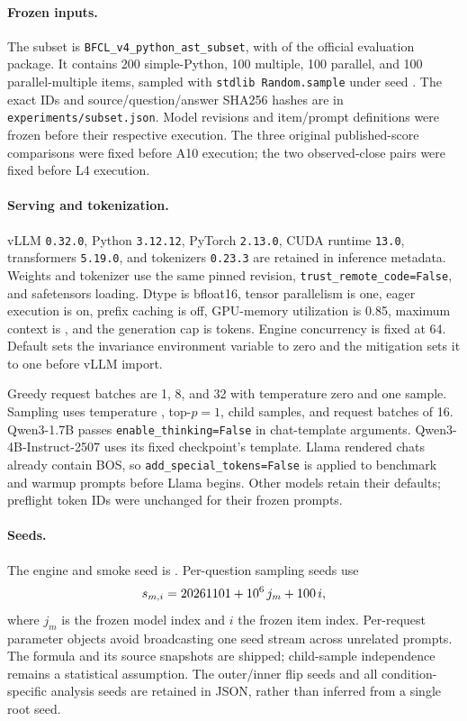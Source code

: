 \documentclass[10pt,twocolumn]{article}
\newcommand{\code}[1]{\texttt{#1}}
\begin{document}
\paragraph{Frozen inputs.}
The subset is \code{BFCL\_v4\_python\_ast\_subset}, with \BFCLVersion{} of the official evaluation package. It contains 200 simple-Python, 100 multiple, 100 parallel, and 100 parallel-multiple items, sampled with \code{stdlib Random.sample} under seed \RootSeed{}. The exact IDs and source/question/answer SHA256 hashes are in \code{experiments/subset.json}. Model revisions and item/prompt definitions were frozen before their respective execution. The three original published-score comparisons were fixed before A10 execution; the two observed-close pairs were fixed before L4 execution.

\paragraph{Serving and tokenization.}
vLLM \code{0.32.0}, Python \code{3.12.12}, PyTorch \code{2.13.0}, CUDA runtime \code{13.0}, transformers \code{5.19.0}, and tokenizers \code{0.23.3} are retained in inference metadata. Weights and tokenizer use the same pinned revision, \code{trust\_remote\_code=False}, and safetensors loading. Dtype is bfloat16, tensor parallelism is one, eager execution is on, prefix caching is off, GPU-memory utilization is 0.85, maximum context is \ContextLimit{}, and the generation cap is \MaxTokens{} tokens. Engine concurrency is fixed at 64. Default sets the invariance environment variable to zero and the mitigation sets it to one before vLLM import.

Greedy request batches are 1, 8, and 32 with temperature zero and one sample. Sampling uses temperature \SampleTemperature{}, top-$p=1$, \NSamples{} child samples, and request batches of 16. Qwen3-1.7B passes \code{enable\_thinking=False} in chat-template arguments. Qwen3-4B-Instruct-2507 uses its fixed checkpoint's template. Llama rendered chats already contain BOS, so \code{add\_special\_tokens=False} is applied to benchmark and warmup prompts before Llama begins. Other models retain their defaults; preflight token IDs were unchanged for their frozen prompts.

\paragraph{Seeds.}
The engine and smoke seed is \RootSeed{}. Per-question sampling seeds use
\[
 s_{m,i}=20261101{}+10^6\,j_m+100\,i,
\]
where $j_m$ is the frozen model index and $i$ the frozen item index. Per-request parameter objects avoid broadcasting one seed stream across unrelated prompts. The formula and its source snapshots are shipped; child-sample independence remains a statistical assumption. The outer/inner flip seeds and all condition-specific analysis seeds are retained in JSON, rather than inferred from a single root seed.
\end{document}
